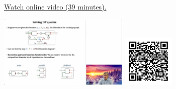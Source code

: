 
\begin{minipage}{10cm}
    \href{https://act4e-spring21.netlify.app/videos/spring2021-functorial-comp-a:solving-queries.html}{Watch online video (39 minutes).}
        
    \href{https://act4e-spring21.netlify.app/videos/spring2021-functorial-comp-a:solving-queries.html}{\includegraphics[height=3.5cm]{spring2021-functorial-comp-a:solving-queries/thumbnails.jpg}}
    \href{https://act4e-spring21.netlify.app/videos/spring2021-functorial-comp-a:solving-queries.html}{\includegraphics[height=2.5cm]{spring2021-functorial-comp-a:solving-queries/qrcode.png}}
\end{minipage}
